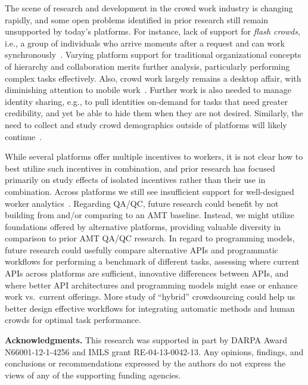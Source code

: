 \documentclass{sigchi}
\begin{document}
The scene of research and development in the crowd work industry is changing rapidly, and some open problems identified in prior research still remain unsupported by today's platforms. For instance, lack of support for {\em flash crowds}, i.e., a group of individuals who arrive moments after a request and can work synchronously~\cite{Kittur13}. Varying platform support for traditional organizational concepts of hierarchy and collaboration merits further analysis, particularly performing complex tasks effectively. Also, crowd work largely remains a desktop affair, with diminishing attention to mobile work~\cite{eagle2009txteagle,mw-kulkarni13}. Further work is also needed to manage identity sharing, e.g., to pull identities on-demand for tasks that need greater credibility, and yet be able to hide them when they are not desired. Similarly, the need to collect and study crowd demographics outside of platforms will likely continue~\cite{Ross10,ipeirotis2010demographics}. 

While several platforms offer multiple incentives to workers, it is not clear how to best utilize such incentives in combination, and prior research has focused primarily on study effects of isolated incentives rather than their use in combination. Across platforms we still see insufficient support for well-designed worker analytics~\cite{heymann2011turkalytics,Rzeszotarski11}. Regarding QA/QC, future research could benefit by not building from and/or comparing to an AMT baseline. Instead, we might utilize foundations offered by alternative platforms, providing valuable diversity in comparison to prior AMT QA/QC research. In regard to programming models, future research could usefully compare alternative APIs and programmatic workflows for performing a benchmark of different tasks, assessing where current APIs across platforms are sufficient, innovative differences between APIs, and where better API architectures and programming models might ease or enhance work vs.\ current offerings. More study of ``hybrid'' crowdsourcing could help us better design effective workflows for integrating automatic methods and human crowds for optimal task performance.
 
{\bf Acknowledgments.} This research was supported in part by DARPA Award N66001-12-1-4256 and IMLS grant RE-04-13-0042-13. Any opinions, findings, and conclusions or recommendations expressed by the authors do not express the views of any of the supporting funding agencies.
\end{document}

